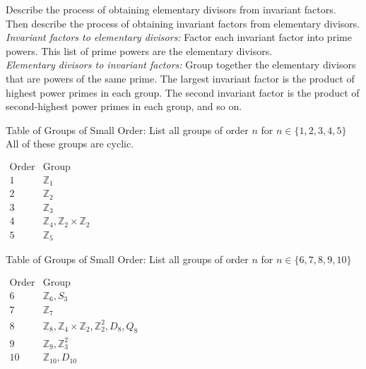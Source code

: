 \documentclass[avery5371,grid]{flashcards}
\newcommand{\Z}{\mathbb{Z}}
\begin{document}
\begin{flashcard}[Groups]{Describe the process of obtaining elementary divisors from invariant factors. \\ \vspace{5pt} Then describe the process of obtaining invariant factors from elementary divisors.}
 \emph{Invariant factors to elementary divisors: } Factor each invariant factor into prime powers. This list of prime powers are the elementary divisors.\\
 
 \emph{Elementary divisors to invariant factors: } Group together the elementary divisors that are powers of the same prime. The largest invariant factor is the product of highest power primes in each group. The second invariant factor is the product of second-highest power primes in each group, and so on.
\end{flashcard}

\begin{flashcard}[Groups]{Table of Groups of Small Order: List all groups of order $n$ for $n \in \{1, 2, 3, 4, 5\}$}
 All of these groups are cyclic.
 {\def\arraystretch{1.5}
 \begin{center} $\begin{array}{c|c}
      \text{Order} & \text{Group} \\
      \hline
      1 & \Z_1 \\
      2 & \Z_2 \\
      3 & \Z_3 \\
      4 & \Z_4, \Z_2 \times \Z_2 \\
      5 & \Z_5
 \end{array}$ \end{center} }
\end{flashcard}

\begin{flashcard}[Groups]{Table of Groups of Small Order: List all groups of order $n$ for $n \in \{6, 7, 8, 9, 10\}$}
{\def\arraystretch{1.5}
 \begin{center} $\begin{array}{c|c}
      \text{Order} & \text{Group} \\
      \hline
      6 & \Z_6, S_3 \\
      7 & \Z_7 \\
      8 & \Z_8, \Z_4 \times \Z_2, \Z_2^2, D_8, Q_8 \\
      9 & \Z_9, \Z_3^2 \\
      10 & \Z_{10}, D_{10}
 \end{array}$ \end{center} }
\end{flashcard}
\end{document}
